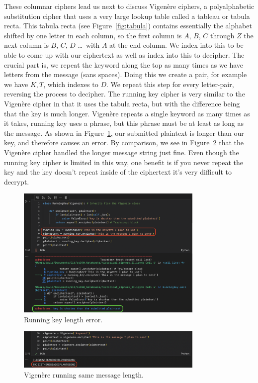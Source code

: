 \documentclass[12pt]{article}
\begin{document}
These columnar ciphers lead us next to discuss Vigen\`ere ciphers, a polyalphabetic substitution cipher that uses a very large lookup table called a tableau or tabula recta. This tabula recta (see Figure~\ref{fig:tabula}) contains essentially the alphabet shifted by one letter in each column, so the first column is \(A\), \(B\), \(C\) through \(Z\) the next column is \(B\), \(C\), \(D\) \ldots\ with \(A\) at the end column. We index into this to be able to come up with our ciphertext as well as index into this to decipher. The crucial part is, we repeat the keyword along the top as many times as we have letters from the message (sans spaces). Doing this we create a pair, for example we have \(K, T\), which indexes to \(D\). We repeat this step for every letter-pair, reversing the process to decipher. The running key cipher is very similar to the Vigen\`ere cipher in that it uses the tabula recta, but with the difference being that the key is much longer. Vigen\`ere repeats a single keyword as many times as it takes, running key uses a phrase, but this phrase must be at least as long as the message. As shown in Figure~\ref{fig:error}, our submitted plaintext is longer than our key, and therefore causes an error. By comparison, we see in Figure~\ref{fig:vignere} that the Vigen\`ere cipher handled the longer message string just fine. Even though the running key cipher is limited in this way, one benefit is if you never repeat the key and the key doesn't repeat inside of the ciphertext it's very difficult to decrypt.

\begin{figure}[!ht]
    \centering
    \includegraphics[width=0.8\textwidth]{figure01.png}
    \caption{Running key length error.}
    \label{fig:error}
\end{figure}

\begin{figure}[!ht]
    \centering
    \includegraphics[width=0.8\textwidth]{figure02.png}
    \caption{Vigen\`ere running same message length.}
    \label{fig:vignere}
\end{figure}
\end{document}
